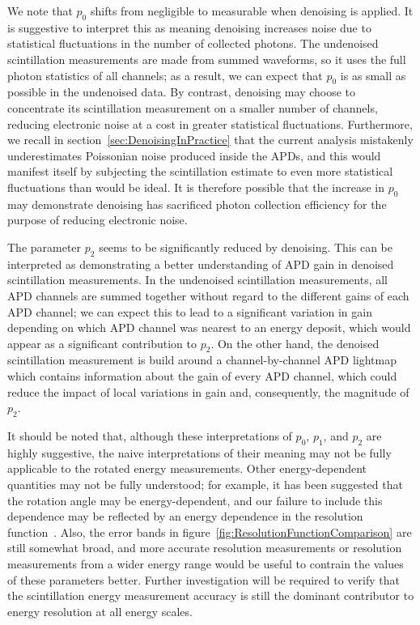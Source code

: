 We note that $p_0$ shifts from negligible to measurable when denoising is applied.  It is suggestive to interpret this as meaning denoising increases noise due to statistical fluctuations in the number of collected photons.  The undenoised scintillation measurements are made from summed waveforms, so it uses the full photon statistics of all channels; as a result, we can expect that $p_0$ is as small as possible in the undenoised data.  By contrast, denoising may choose to concentrate its scintillation measurement on a smaller number of channels, reducing electronic noise at a cost in greater statistical fluctuations.  Furthermore, we recall in section~\ref{sec:DenoisingInPractice} that the current analysis mistakenly underestimates Poissonian noise produced inside the APDs, and this would manifest itself by subjecting the scintillation estimate to even more statistical fluctuations than would be ideal.  It is therefore possible that the increase in $p_0$ may demonstrate denoising has sacrificed photon collection efficiency for the purpose of reducing electronic noise.

The parameter $p_2$ seems to be significantly reduced by denoising.  This can be interpreted as demonstrating a better understanding of APD gain in denoised scintillation measurements.  In the undenoised scintillation measurements, all APD channels are summed together without regard to the different gains of each APD channel; we can expect this to lead to a significant variation in gain depending on which APD channel was nearest to an energy deposit, which would appear as a significant contribution to $p_2$.  On the other hand, the denoised scintillation measurement is build around a channel-by-channel APD lightmap which contains information about the gain of every APD channel, which could reduce the impact of local variations in gain and, consequently, the magnitude of $p_2$.

It should be noted that, although these interpretations of $p_0$, $p_1$, and $p_2$ are highly suggestive, the naive interpretations of their meaning may not be fully applicable to the rotated energy measurements.  Other energy-dependent quantities may not be fully understood; for example, it has been suggested that the rotation angle may be energy-dependent, and our failure to include this dependence may be reflected by an energy dependence in the resolution function~\cite{EnergyDocumentRun2a}.  Also, the error bands in figure~\ref{fig:ResolutionFunctionComparison} are still somewhat broad, and more accurate resolution measurements or resolution measurements from a wider energy range would be useful to contrain the values of these parameters better.  Further investigation will be required to verify that the scintillation energy measurement accuracy is still the dominant contributor to energy resolution at all energy scales.

